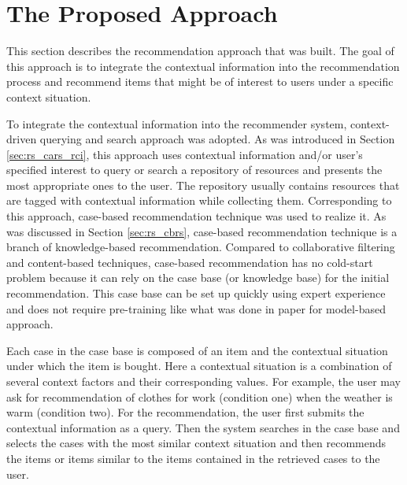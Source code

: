 \section{The Proposed Approach} \label{sec:pa}

This section describes the recommendation approach that was built. The goal of this approach is to integrate the contextual information into the recommendation process and recommend items that might be of interest to users under a specific context situation.

To integrate the contextual information into the recommender system,  context-driven querying and search approach was adopted. As was introduced in Section \ref{sec:rs_cars_rci}, this approach uses contextual information and/or user's specified interest to query or search a repository of resources and presents the most appropriate ones to the user. The repository usually contains resources that are tagged with contextual information while collecting them. Corresponding to this approach, case-based recommendation technique was used to realize it. As was discussed in Section \ref{sec:rs_cbrs}, case-based recommendation technique is a branch of knowledge-based recommendation. Compared to collaborative filtering and content-based techniques, case-based recommendation has no cold-start problem because it can rely on the case base (or knowledge base) for the initial recommendation. This case base can be set up quickly using expert experience and does not require pre-training like what was done in paper \cite{ref:5} for model-based approach. 

Each case in the case base is composed of an item and the contextual situation under which the item is bought. Here a contextual situation is a combination of several context factors and their corresponding values. For example, the user may ask for recommendation of clothes for work (condition one) when the weather is warm (condition two). For the recommendation, the user first submits the contextual information as a query. Then the system searches in the case base and selects the cases with the most similar context situation and then recommends the items or items similar to the items contained in the retrieved cases to the user. 

